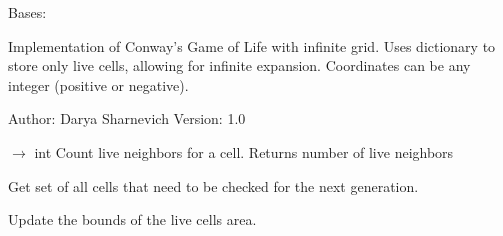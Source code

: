 \documentclass[letterpaper,10pt,oneside,english]{sphinxhowto}
\begin{document}
\begin{fulllineitems}
\label{\detokenize{core:core.infinite_game.InfiniteGameOfLife}}
\pysigstartsignatures
\pysigline
{}
\pysigstopsignatures
\sphinxAtStartPar
Bases: 

\sphinxAtStartPar
Implementation of Conway’s Game of Life with infinite grid.
Uses dictionary to store only live cells, allowing for infinite expansion.
Coordinates can be any integer (positive or negative).

\sphinxAtStartPar
Author: Darya Sharnevich
Version: 1.0

\begin{fulllineitems}
\label{\detokenize{core:core.infinite_game.InfiniteGameOfLife._count_neighbors}}
\pysigstartsignatures
\pysiglinewithargsret
{}
{\sphinxparamcomma {}}
{{ $\rightarrow$ int}}
\pysigstopsignatures
\sphinxAtStartPar
Count live neighbors for a cell. Returns number of live neighbors

\end{fulllineitems}


\begin{fulllineitems}
\label{\detokenize{core:core.infinite_game.InfiniteGameOfLife._get_cells_to_check}}
\pysigstartsignatures
\pysiglinewithargsret
{}
{}
{}
\pysigstopsignatures
\sphinxAtStartPar
Get set of all cells that need to be checked for the next generation.

\end{fulllineitems}


\begin{fulllineitems}
\label{\detokenize{core:core.infinite_game.InfiniteGameOfLife._update_bounds}}
\pysigstartsignatures
\pysiglinewithargsret
{}
{}
{}
\pysigstopsignatures
\sphinxAtStartPar
Update the bounds of the live cells area.


\end{fulllineitems}
\end{fulllineitems}
\end{document}
